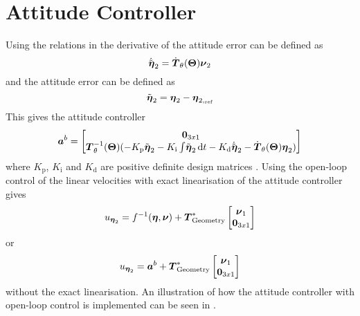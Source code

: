 \section{Attitude Controller}  
Using the relations in  the derivative of the attitude error can be defined as 
\begin{equation}
\etaTildeAngdot = \dot{\boldsymbol{T}}_\theta(\eulerAngles)\nuVectorAng
\end{equation}
and the attitude error can be defined as 
\begin{equation}
\etaTildeAng = \etaVectorAng - \etaVectorAng[,_{\text{ref}}] 
\end{equation}
This gives the \abbrPID attitude controller
\begin{equation}
	\accVector^b = \begin{bmatrix} 
	\zeroCol{3} \\
	\boldsymbol{T}^{-1}_\theta(\eulerAngles)(-K_{\text{p}} \etaTildeAng - K_{\text{i}}\int \! \etaTildeAng \, \mathrm{d}t - K_{\text{d}} \etaTildeAngdot - \dot{\boldsymbol{T}}_\theta(\eulerAngles) \etaVectorAng)
	\end{bmatrix}
\end{equation}
where $K_{\text{p}}$, $K_{\text{i}}$ and $K_{\text{d}}$ are positive definite design matrices \citep[p. 453]{fossen2011}. 
Using the open-loop control of the linear velocities with exact linearisation of the attitude controller gives
\begin{equation}
	u_{\etaVectorAng} = f^{-1}(\etaVector,\nuVector) + \thrusterGeometryOnes[*] \begin{bmatrix} \nuVectorLin \\ \zeroCol{3} \end{bmatrix}
\end{equation}
or
\begin{equation}
	u_{\etaVectorAng} = \accVector^b + \thrusterGeometryOnes[*] \begin{bmatrix} \nuVectorLin \\ \zeroCol{3} \end{bmatrix}
\end{equation}
without the exact linearisation. An illustration of how the attitude controller with open-loop control is implemented can be seen in .

